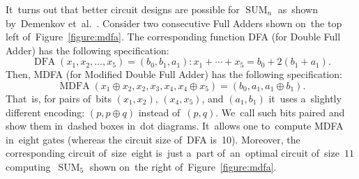 \documentclass[sigconf, review, anonymous]{acmart}
\DeclareMathOperator{\SUM}{SUM}
\DeclareMathOperator{\MDFA}{MDFA}
\begin{document}
It~turns out that better circuit designs are possible for $\SUM_n$
as~shown by~Demenkov et~al.~\cite{DBLP:journals/ipl/DemenkovKKY10}.
Consider two consecutive Full Adders shown on~the top left of~Figure~\ref{figure:mdfa}. The corresponding function DFA (for Double Full Adder) has the following specification: \[\operatorname{DFA}(x_1, x_2,\dotsc,x_5)=(b_0,b_1,a_1) \colon x_1+\dotsb+x_5=b_0+2(b_1+a_1).\]
Then, MDFA (for Modified Double Full Adder) has the following specification:
\[\MDFA(x_1 \oplus x_2, x_2, x_3, x_4, x_4 \oplus x_5)=(b_0, a_1, a_1 \oplus b_1).\]
That~is, for pairs of~bits $(x_1, x_2)$, $(x_4, x_5)$, and $(a_1, b_1)$
it~uses a~slightly different encoding: $(p, p \oplus q)$ instead of~$(p,q)$.
We~call such bits paired and show them in~dashed boxes in~dot diagrams.
It~allows one to~compute MDFA in~eight gates (whereas the circuit size of~DFA is~10). Moreover, the corresponding circuit of~size~eight is~just a~part
of~an~optimal circuit of~size~$11$ computing~$\SUM_5$ shown on~the right
of~Figure~\ref{figure:mdfa}.
\end{document}
